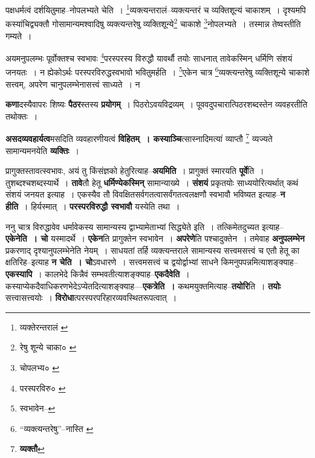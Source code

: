 \documentclass[article,12pt,a4paper]{memoir}
\begin{document}
	  \pstart पक्षधर्मत्वं दर्शयितुमाह--नोपलभ्यते चेति । \footnote{व्यक्तेरन्तरालं \cite{dp-msA} \cite{dp-msB} \cite{dp-edP} \cite{dp-edH}}\-व्यक्त्यन्तरालं--व्यक्त्यन्तरं च व्यक्तिशून्यं चाकाशम् । दृश्यमपि कस्यांचिद्व्यक्तौ गोसामान्यमश्वादिषु व्यक्त्यन्तरेषु व्यक्तिशून्ये\footnote{रेषु शून्ये चाका० \cite{dp-msA}} चाकाशे \footnote{चोपलभ्य० \cite{dp-msA} \cite{dp-msB} \cite{dp-edP} \cite{dp-edH}}\-नोपलभ्यते । तस्मान्न तेष्वस्तीति गम्यते ।
	\pend
       

	  \pstart अयमनुपलम्भः पूर्वोक्तश्च स्वभावः \footnote{परस्परविरु० \cite{dp-msA} \cite{dp-msB} \cite{dp-msC} \cite{dp-edP} \cite{dp-edH} \cite{dp-edE} \cite{dp-edN}}\-परस्परस्य विरुद्धौ यावर्थौ तयोः साधनात् तावेकस्मिन् धर्मिणि संशयं जनयतः । न ह्येकोऽर्थः परस्परविरुद्धस्वभावो भवितुमर्हति । \footnote{स्वभावेन--\cite{dp-msD-n}}\-एकेन चात्र \footnote{“व्यक्त्यन्तरेषु”--नास्ति \cite{dp-msB}}\-व्यक्त्यन्तरेषु व्यक्तिशून्ये चाकाशे सत्त्वम्, अपरेण चानुपलम्भेनासत्त्वं साध्यते । न
	\pend
      
	  \endgroup
	

	  \pstart \textbf{कणा}दस्यैवापरः शिष्यः \textbf{पैठर}स्तस्य \textbf{प्रयोगम्} । पिठरोऽवयविद्रव्यम् । पूववदुपचारात्पिठरशब्दस्तेन व्यवहरतीति तथोक्तः ।
	\pend
      

	  \pstart \textbf{असदव्यवहार्यत्व}मसदिति व्यवहारणीयत्वं \textbf{विहितम् । कस्याञ्चि}त्सास्नादिमत्यां व्याप्तौ \footnote{\textbf{व्यक्तौ}} व्यज्यते सामान्यमनयेति \textbf{व्यक्तिः} ।
	\pend
      

	  \pstart प्रागुक्तस्तावत्स्वभावः, अयं तु किंसंज्ञको हेतुरित्याह--\textbf{अयमिति} । प्रागुक्तं स्मारयति \textbf{पूर्वे}ति । तुशब्दश्चशब्दस्यार्थे । \textbf{तावे}तौ हेतू \textbf{धर्मिण्येकस्मिन्} सामान्याख्ये । \textbf{संशयं} प्रकृतयोः साध्ययोरित्यर्थात् कथं संशयं जनयत इत्याह । एकस्यैव तौ विवक्षितसर्वगतत्वासर्वंगतत्वलक्षणौ स्वभावौ भविष्यत इत्याह--\textbf{न हीति} । हिर्यस्मात् । \textbf{परस्परविरुद्धौ स्वभावौ} यस्येति तथा ।
	\pend
      

	  \pstart ननु चात्र विरुद्धावेव धर्मावेकस्य सामान्यस्य द्वाभ्यामेताभ्यां सिद्ध्येते इति । तत्किमेतदुच्यत इत्याह--\textbf{एकेनेति । चो} यस्मादर्थे । \textbf{एकेन}ति प्रागुक्तेन स्वभावेन । \textbf{अपरेणे}ति पश्चादुक्तेन । तमेवाह \textbf{अनुपलम्भेन} प्रकरणाद् दृश्यानुपलम्भेनेति नेयम् । साधयतां तर्हि व्यक्त्यन्तराले सामान्यस्य सत्त्वमसत्त्वं च एतौ हेतू का क्षतिरिह--इत्याह \textbf{न चेति । चो}ऽवधारणे । सत्त्वमसत्त्वं च द्वयोर्द्वाभ्यां साधने किमनुपपन्नमित्याशङ्क्याह--\textbf{एकस्यापि} । कालभेदे किन्नैवं सम्भवतीत्याशङ्क्याह--\textbf{एकदैवेति} । कस्याप्येकदैवाधिकरणभेदेऽप्येतदित्याशङ्क्याह—\textbf{एकत्रेति ।} कथमयुक्तमित्याह--\textbf{तयोरि}ति । \textbf{तयोः} सत्त्वासत्त्वयोः । \textbf{विरोधा}त्परस्परपरिहारव्यवस्थितरूपत्वात् ।
	\pend
      
\end{document}
